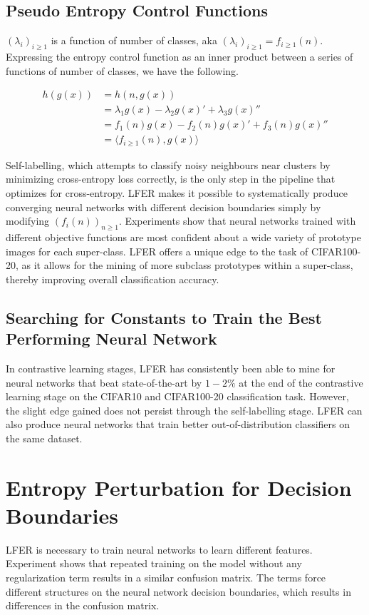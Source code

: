 \documentclass[journal]{journal}
\begin{document}
\subsection{Pseudo Entropy Control Functions}

$(\lambda_{i})_{i \geq 1}$ is a function of number of classes, aka $(\lambda_{i})_{i \geq 1} = f_{i \geq 1} (n) $. Expressing the entropy control function as an inner product between a series of functions of number of classes, we have the following. 

\begin{equation}
\begin{aligned}
    h(g(x)) & = h(n, g(x)) \\
            & = \lambda_{1}g(x) - \lambda_{2}g(x)' + \lambda_{3}g(x)'' \\
            & = f_{1}(n)g(x) - f_{2}(n)g(x)' + f_{3}(n)g(x)'' \\
            & = \langle f_{i \geq 1} (n), g(x) \rangle 
\end{aligned}
\end{equation}

Self-labelling, which attempts to classify noisy neighbours near clusters by minimizing cross-entropy loss correctly, is the only step in the pipeline that optimizes for cross-entropy. LFER makes it possible to systematically produce converging neural networks with different decision boundaries simply by modifying $(f_{i}(n))_{n \geq 1}$. Experiments show that neural networks trained with different objective functions are most confident about a wide variety of prototype images for each super-class. LFER offers a unique edge to the task of CIFAR100-20, as it allows for the mining of more subclass prototypes within a super-class, thereby improving overall classification accuracy.

\subsection{Searching for Constants to Train the Best Performing Neural Network}
In contrastive learning stages, LFER has consistently been able to mine for neural networks that beat state-of-the-art by $1-2\%$ at the end of the contrastive learning stage on the CIFAR10 and CIFAR100-20 classification task. However, the slight edge gained does not persist through the self-labelling stage. LFER can also produce neural networks that train better out-of-distribution classifiers on the same dataset. 

\section{Entropy Perturbation for Decision Boundaries}
LFER is necessary to train neural networks to learn different features. Experiment shows that repeated training on the model without any regularization term results in a similar confusion matrix. The terms force different structures on the neural network decision boundaries, which results in differences in the confusion matrix. 
\end{document}
